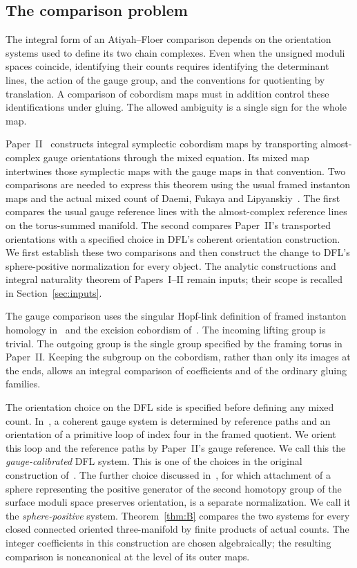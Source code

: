 \documentclass[11pt]{amsart}
\theoremstyle{definition}
\theoremstyle{remark}
\theoremstyle{plain}
\begin{document}
\subsection{The comparison problem}
The integral form of an Atiyah--Floer comparison depends on the
orientation systems used to define its two chain complexes. Even when
the unsigned moduli spaces coincide, identifying their counts requires
identifying the determinant lines, the action of the gauge group, and
the conventions for quotienting by translation. A comparison of
cobordism maps must in addition control these identifications under
gluing. The allowed ambiguity is a single sign for the whole map.

Paper~II~\cite{PaperII} constructs integral symplectic cobordism maps
by transporting almost-complex gauge orientations through the mixed
equation. Its mixed map intertwines those symplectic maps with the
gauge maps in that convention. Two comparisons are needed to express
this theorem using the usual framed instanton maps and the actual
mixed count of Daemi, Fukaya and Lipyanskiy~\cite{DFL}. The first
compares the usual gauge reference lines with the almost-complex
reference lines on the torus-summed manifold. The second compares
Paper~II's transported orientations with a specified choice in DFL's
coherent orientation construction. We first establish these two comparisons and then construct the
change to DFL's sphere-positive normalization for every object. The analytic constructions and integral naturality theorem of
Papers~I--II remain inputs; their scope is recalled in
Section~\ref{sec:inputs}.

The gauge comparison uses the singular Hopf-link definition of framed
instanton homology in~\cite[Sections~4.3--4.4]{KM} and the excision
cobordism of~\cite[Proposition~5.7]{KM}. The incoming lifting group is
trivial. The outgoing group is the single group specified by the
framing torus in Paper~II. Keeping the subgroup on the cobordism,
rather than only its images at the ends, allows an integral comparison
of coefficients and of the ordinary gluing families.

The orientation choice on the DFL side is specified before defining
any mixed count. In~\cite[Section~2.4]{DFL}, a coherent gauge system
is determined by reference paths and an orientation of a primitive
loop of index four in the framed quotient. We orient this loop and
the reference paths by Paper~II's gauge reference. We call this the
\emph{gauge-calibrated} DFL system. This is one of the choices in the
original construction of~\cite[Sections~2.4 and~4.7]{DFL}. The further
choice discussed in~\cite[Remark~4.76]{DFL}, for which attachment of
a sphere representing the positive generator of the second homotopy
group of the surface moduli space preserves orientation, is a
separate normalization.
We call it the \emph{sphere-positive} system. Theorem~\ref{thm:B} compares the two systems for every closed
connected oriented three-manifold by finite products of actual
counts. The integer coefficients in this construction are chosen
algebraically; the resulting comparison is noncanonical at the
level of its outer maps.
\end{document}
